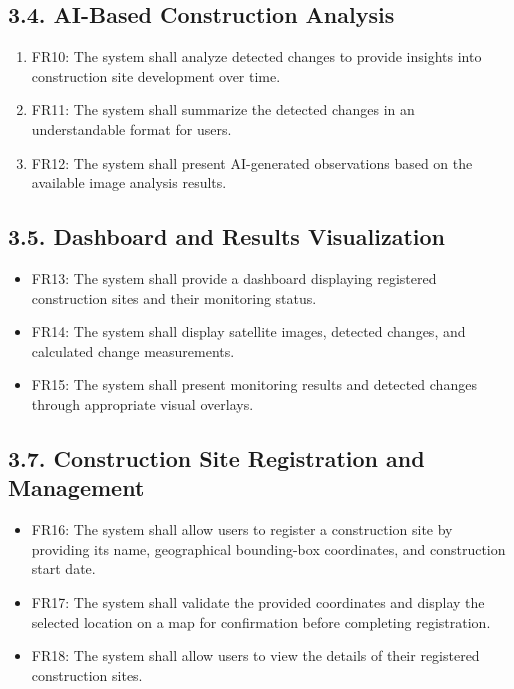 \documentclass[12pt,a4paper]{report}
\begin{document}
\subsection{3.4. AI-Based Construction
Analysis}\label{ai-based-construction-analysis}

\begin{enumerate}
\def\labelenumi{\arabic{enumi}.}
\item
  FR10: The system shall analyze detected changes to provide insights
  into construction site development over time.
\item
  FR11: The system shall summarize the detected changes in an
  understandable format for users.
\item
  FR12: The system shall present AI-generated observations based on the
  available image analysis results.
\end{enumerate}

\subsection{3.5. Dashboard and Results
Visualization}\label{dashboard-and-results-visualization}

\begin{itemize}
\item
  FR13: The system shall provide a dashboard displaying registered
  construction sites and their monitoring status.
\item
  FR14: The system shall display satellite images, detected changes, and
  calculated change measurements.
\item
  FR15: The system shall present monitoring results and detected changes
  through appropriate visual overlays.
\end{itemize}

\subsection{3.7. Construction Site Registration and
Management}\label{construction-site-registration-and-management}

\begin{itemize}
\item
  FR16: The system shall allow users to register a construction site by
  providing its name, geographical bounding-box coordinates, and
  construction start date.
\item
  FR17: The system shall validate the provided coordinates and display
  the selected location on a map for confirmation before completing
  registration.
\item
  FR18: The system shall allow users to view the details of their
  registered construction sites.
\end{itemize}
\end{document}

